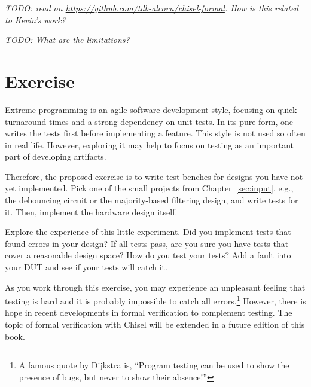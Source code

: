 \documentclass[%
    10pt,
    headinclude, footexclude,
    openright, %
    notitlepage,
    cleardoubleempty,
    headsepline,
    pointlessnumbers,
    bibtotoc, idxtotoc,
    ]{scrbook}
\newcommand{\todo}[1]{{\emph{TODO: #1}}}
\begin{document}
\todo{read on \url{https://github.com/tdb-alcorn/chisel-formal}.
How is this related to Kevin's work?}

\todo{What are the limitations?}





\section{Exercise}

\href{https://en.wikipedia.org/wiki/Extreme_programming}{Extreme programming} is an agile
software development style, focusing on quick turnaround times and a strong dependency on unit
tests. In its pure form, one writes the tests first before implementing a feature. This style is not used
so often in real life. However, exploring it may help to focus on testing as an important part of
developing artifacts.

Therefore, the proposed exercise is to write test benches for designs you have not yet implemented.
Pick one of the small projects from Chapter~\ref{sec:input}, e.g., the debouncing circuit or
the majority-based filtering design, and write tests for it. Then, implement the hardware design
itself.

Explore the experience of this little experiment. Did you implement tests that found errors in your design?
If all tests pass, are you sure you have tests that cover a reasonable design space? How do you test
your tests? Add a fault into your DUT and see if your tests will catch it.

As you work through this exercise, you may experience an unpleasant feeling that testing is hard and
it is probably impossible to catch all errors.\footnote{A famous quote by Dijkstra is, ``Program testing can
be used to show the presence of bugs, but never to show their absence!''}
However, there is hope in recent developments in formal verification to complement testing.
The topic of formal verification with Chisel will be extended in a future edition of this book.
\end{document}
